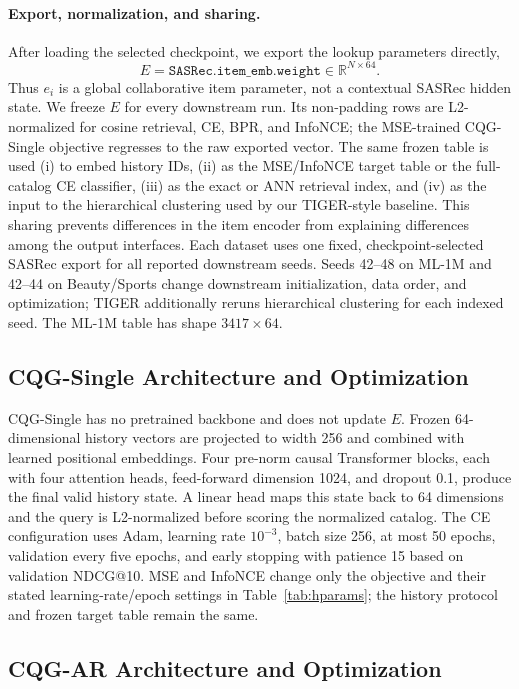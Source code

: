\documentclass[preprint,12pt]{elsarticle}
\begin{document}
\paragraph{Export, normalization, and sharing.}
After loading the selected checkpoint, we export the lookup parameters
directly,
\[
  E=\texttt{SASRec.item\_emb.weight}\in\mathbb{R}^{N\times64}.
\]
Thus \(e_i\) is a global collaborative item parameter, not a contextual
SASRec hidden state.  We freeze \(E\) for every downstream run.  Its
non-padding rows are L2-normalized for cosine retrieval, CE, BPR, and
InfoNCE; the MSE-trained CQG-Single objective regresses to the raw exported
vector.  The same frozen table is used (i) to embed history IDs,
(ii) as the MSE/InfoNCE target table or the full-catalog CE classifier,
(iii) as the exact or ANN retrieval index, and (iv) as the input to the
hierarchical clustering used by our TIGER-style baseline. This sharing
prevents differences in the item encoder from explaining differences among
the output interfaces. Each dataset uses one fixed, checkpoint-selected
SASRec export for all reported downstream seeds. Seeds 42--48 on ML-1M and
42--44 on Beauty/Sports change downstream initialization, data order, and
optimization; TIGER additionally reruns hierarchical clustering for each
indexed seed. The ML-1M table has shape \(3417\times64\).

\subsection{CQG-Single Architecture and Optimization}
\label{app:cqg-single-training}

CQG-Single has no pretrained backbone and does not update \(E\).  Frozen
64-dimensional history vectors are projected to width 256 and combined with
learned positional embeddings.  Four pre-norm causal Transformer blocks,
each with four attention heads, feed-forward dimension 1024, and dropout 0.1,
produce the final valid history state.  A linear head maps this state back to
64 dimensions and the query is L2-normalized before scoring the normalized
catalog.  The CE configuration uses Adam, learning rate \(10^{-3}\), batch
size 256, at most 50 epochs, validation every five epochs, and early stopping
with patience 15 based on validation NDCG@10.  MSE and InfoNCE change only
the objective and their stated learning-rate/epoch settings in
Table~\ref{tab:hparams}; the history protocol and frozen target table remain
the same.

\subsection{CQG-AR Architecture and Optimization}
\label{app:cqg-ar-training}
\end{document}

